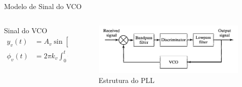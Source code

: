 \documentclass[aspectratio=169,dvipsnames]{beamer}
\begin{document}
\begin{frame}{Modelo de Sinal do VCO}

\begin{columns}[T] %
    \begin{column}{0.5\textwidth} %
        
        \begin{block}{Sinal do VCO}
            \begin{align*}
            y_v(t) &= A_v \sin[2\pi f_c t + \phi_v(t)], \\
            \phi_v(t) &= 2\pi k_v \int_{0}^{t} v(\tau) d\tau.
            \end{align*}
        \end{block}

    \end{column}
    
    \begin{column}{0.5\textwidth} %

        \begin{figure}
            \centering
            \includegraphics[width=\linewidth]{Figs/FM/PLL.png}
            \caption{Estrutura do PLL}
            \label{fig:enter-label}
        \end{figure}

    \end{column}
\end{columns}

\end{frame}
\end{document}
